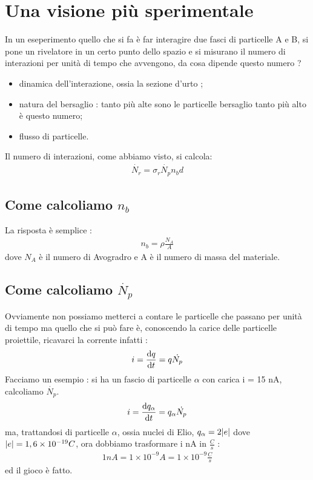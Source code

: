 \section{Una visione più sperimentale}
In un eseperimento quello che si fa è far interagire due fasci di particelle A e B, si pone 
un rivelatore in un certo punto dello spazio e si misurano il numero di interazioni per unità di tempo
che avvengono, da cosa dipende questo numero ? 
\begin{itemize}
        \item dinamica dell'interazione, ossia la sezione d'urto ;
        \item natura del bersaglio : tanto più alte sono le particelle bersaglio tanto 
                più alto è questo numero;
        \item flusso di particelle.
\end{itemize}
Il numero di interazioni, come abbiamo visto, si calcola:
\begin{align*}
    \dot{N_{r}} = \sigma_{r}\dot{N_{p}}n_{b}d
\end{align*}
\subsection{Come calcoliamo $n_{b}$}
La risposta è semplice : 
\begin{align*}
        n_{b} = \rho\frac{N_{A}}{A}
\end{align*}
dove $N_{A}$ è il numero di Avogradro e A è il numero di massa del materiale.
\subsection{Come calcoliamo $\dot{N_{p}}$}
Ovviamente non possiamo metterci a contare le particelle che passano per unità di tempo 
ma quello che si può fare è, conoscendo la carice delle particelle proiettile, ricavarci la 
corrente infatti : 
\begin{align*}
    i = \dv{q}{t} = q\dot{N_{p}}
\end{align*}
Facciamo un esempio : si ha un fascio di particelle $\alpha$ con carica i = 15 nA, calcoliamo 
$\dot{N_{p}}$. \\
\begin{align*}
        i = \dv{q_{\alpha}}{t} = q_{\alpha}\dot{N_{p}}
\end{align*}
ma, trattandosi di particelle $\alpha$, ossia nuclei di Elio, $q_{\alpha} = 2\abs{e}$ 
dove $\abs{e} = 1,6\times10^{-19}C$, ora dobbiamo trasformare i nA in $\frac{C}{s}$ : 
\begin{align*}
    1nA = 1\times10^{-9}A = 1\times10^{-9}\frac{C}{s}
\end{align*}
ed il gioco è fatto.
